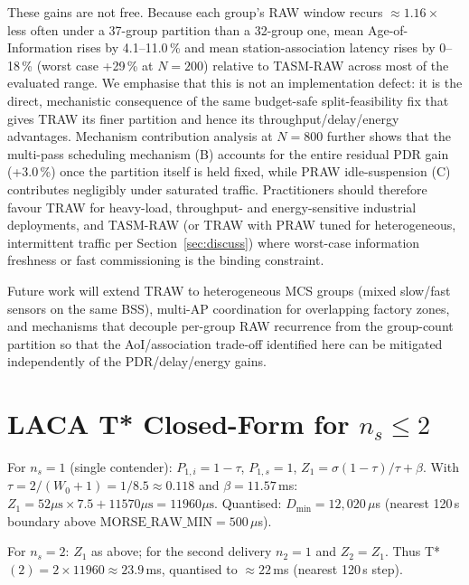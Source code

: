 \documentclass[journal]{IEEEtran}
\begin{document}
These gains are not free. Because each group's RAW window recurs
$\approx\!1.16\times$ less often under a 37-group partition than a
32-group one, mean Age-of-Information rises by 4.1--11.0\,\% and mean
station-association latency rises by 0--18\,\% (worst case +29\,\% at
$N\!=\!200$) relative to TASM-RAW across most of the evaluated range.
We emphasise that this is not an implementation defect: it is the
direct, mechanistic consequence of the same budget-safe
split-feasibility fix that gives TRAW its finer partition and hence its
throughput/delay/energy advantages. Mechanism contribution analysis at
$N\!=\!800$ further shows that the multi-pass scheduling mechanism (B)
accounts for the entire residual PDR gain (+3.0\,\%) once the partition
itself is held fixed, while PRAW idle-suspension (C) contributes
negligibly under saturated traffic. Practitioners should therefore
favour TRAW for heavy-load, throughput- and energy-sensitive industrial
deployments, and TASM-RAW (or TRAW with PRAW tuned for heterogeneous,
intermittent traffic per Section~\ref{sec:discuss}) where worst-case
information freshness or fast commissioning is the binding constraint.

Future work will extend TRAW to heterogeneous MCS groups (mixed
slow/fast sensors on the same BSS), multi-AP coordination for
overlapping factory zones, and mechanisms that decouple per-group RAW
recurrence from the group-count partition so that the AoI/association
trade-off identified here can be mitigated independently of the
PDR/delay/energy gains.

\appendix
\section{LACA T* Closed-Form for $n_s\!\leq\!2$}
\label{app:laca}

For $n_s\!=\!1$ (single contender): $P_{1,i}\!=\!1\!-\!\tau$,
$P_{1,s}\!=\!1$, $Z_1\!=\!\sigma(1\!-\!\tau)/\tau + \beta$.
With $\tau\!=\!2/(W_0\!+\!1)\!=\!1/8.5\!\approx\!0.118$ and
$\beta\!=\!11.57$\,ms:
$Z_1\!=\!52\mu\text{s}\!\times\!7.5 + 11570\mu\text{s}\!=\!11960\mu\text{s}$.
Quantised: $D_\mathrm{min}\!=\!12{,}020\,\mu$s (nearest 120\,\textmu{}s
boundary above $\text{MORSE\_RAW\_MIN}\!=\!500\,\mu$s).

For $n_s\!=\!2$: $Z_1$ as above; for the second delivery
$n_2\!=\!1$ and $Z_2\!=\!Z_1$. Thus
T*$(2)\!=\!2\!\times\!11960\!\approx\!23.9$\,ms, quantised to
$\approx\!22$\,ms (nearest 120\,\textmu{}s step).
\end{document}
